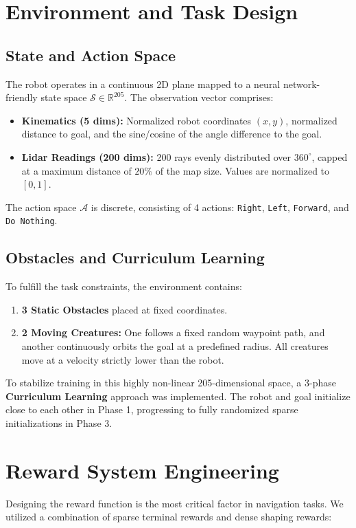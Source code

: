 \documentclass{article}
\begin{document}
\section{Environment and Task Design}

\subsection{State and Action Space}
The robot operates in a continuous 2D plane mapped to a neural network-friendly state space $\mathcal{S} \in \mathbb{R}^{205}$. The observation vector comprises:
\begin{itemize}
    \item \textbf{Kinematics (5 dims):} Normalized robot coordinates $(x, y)$, normalized distance to goal, and the sine/cosine of the angle difference to the goal.
    \item \textbf{Lidar Readings (200 dims):} 200 rays evenly distributed over $360^\circ$, capped at a maximum distance of $20\%$ of the map size. Values are normalized to $[0, 1]$.
\end{itemize}
The action space $\mathcal{A}$ is discrete, consisting of 4 actions: \texttt{Right}, \texttt{Left}, \texttt{Forward}, and \texttt{Do Nothing}.

\subsection{Obstacles and Curriculum Learning}
To fulfill the task constraints, the environment contains:
\begin{enumerate}
    \item \textbf{3 Static Obstacles} placed at fixed coordinates.
    \item \textbf{2 Moving Creatures:} One follows a fixed random waypoint path, and another continuously orbits the goal at a predefined radius. All creatures move at a velocity strictly lower than the robot.
\end{enumerate}
To stabilize training in this highly non-linear 205-dimensional space, a 3-phase \textbf{Curriculum Learning} approach was implemented. The robot and goal initialize close to each other in Phase 1, progressing to fully randomized sparse initializations in Phase 3.

\section{Reward System Engineering}
Designing the reward function is the most critical factor in navigation tasks. We utilized a combination of sparse terminal rewards and dense shaping rewards:
\end{document}

